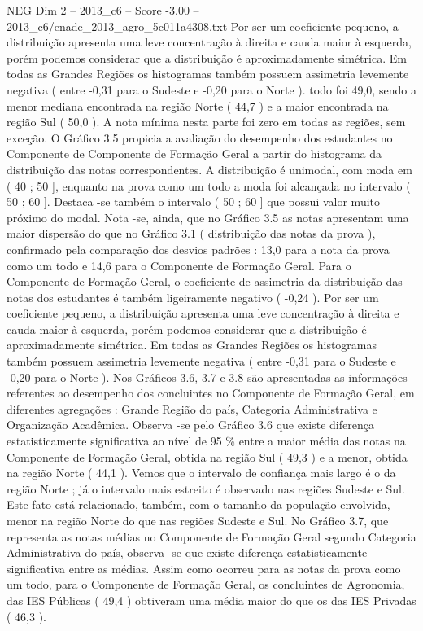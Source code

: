 \begin{textsample}{NEG Dim 2 – 2013\_c6 – Score -3.00 – 2013\_c6/enade\_2013\_agro\_5c011a4308.txt}
Por ser um coeficiente pequeno, a distribuição apresenta uma leve concentração à direita e cauda maior à esquerda, porém podemos considerar que a distribuição é aproximadamente simétrica.
Em todas as Grandes Regiões os histogramas também possuem assimetria levemente negativa ( entre -0,31 para o Sudeste e -0,20 para o Norte ). todo foi 49,0, sendo a menor mediana encontrada na região Norte ( 44,7 ) e a maior encontrada na região Sul ( 50,0 ).
A nota mínima nesta parte foi zero em todas as regiões, sem exceção.
O Gráfico 3.5 propicia a avaliação do desempenho dos estudantes no Componente de Componente de Formação Geral a partir do histograma da distribuição das notas correspondentes.
A distribuição é unimodal, com moda em ( 40 ; 50 ], enquanto na prova como um todo a moda foi alcançada no intervalo ( 50 ; 60 ].
Destaca -se também o intervalo ( 50 ; 60 ] que possui valor muito próximo do modal.
Nota -se, ainda, que no Gráfico 3.5 as notas apresentam uma maior dispersão do que no Gráfico 3.1 ( distribuição das notas da prova ), confirmado pela comparação dos desvios padrões : 13,0 para a nota da prova como um todo e 14,6 para o Componente de Formação Geral.
Para o Componente de Formação Geral, o coeficiente de assimetria da distribuição das notas dos estudantes é também ligeiramente negativo ( -0,24 ).
Por ser um coeficiente pequeno, a distribuição apresenta uma leve concentração à direita e cauda maior à esquerda, porém podemos considerar que a distribuição é aproximadamente simétrica.
Em todas as Grandes Regiões os histogramas também possuem assimetria levemente negativa ( entre -0,31 para o Sudeste e -0,20 para o Norte ).
Nos Gráficos 3.6, 3.7 e 3.8 são apresentadas as informações referentes ao desempenho dos concluintes no Componente de Formação Geral, em diferentes agregações : Grande Região do país, Categoria Administrativa e Organização Acadêmica.
Observa -se pelo Gráfico 3.6 que existe diferença estatisticamente significativa ao nível de 95 \% entre a maior média das notas na Componente de Formação Geral, obtida na região Sul ( 49,3 ) e a menor, obtida na região Norte ( 44,1 ).
Vemos que o intervalo de confiança mais largo é o da região Norte ; já o intervalo mais estreito é observado nas regiões Sudeste e Sul.
Este fato está relacionado, também, com o tamanho da população envolvida, menor na região Norte do que nas regiões Sudeste e Sul.
No Gráfico 3.7, que representa as notas médias no Componente de Formação Geral segundo Categoria Administrativa do país, observa -se que existe diferença estatisticamente significativa entre as médias.
Assim como ocorreu para as notas da prova como um todo, para o Componente de Formação Geral, os concluintes de Agronomia, das IES Públicas ( 49,4 ) obtiveram uma média maior do que os das IES Privadas ( 46,3 ).

\end{textsample}
